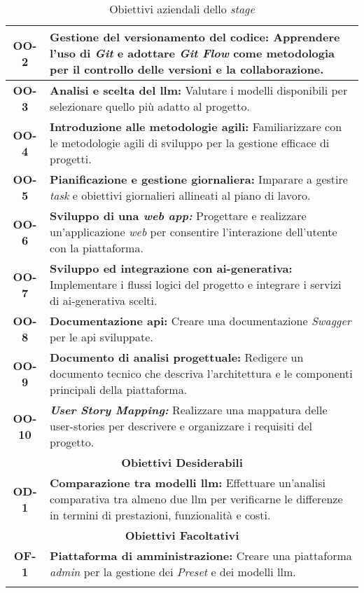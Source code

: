 \begin{longtable}{|c|>{\centering\arraybackslash}p{}|}
    \hline
    \textbf{OO-2} & \textbf{Gestione del versionamento del codice:} Apprendere l'uso di \textit{Git} e adottare \textit{Git Flow} come metodologia per il controllo delle versioni e la collaborazione. \\
    \hline
    \textbf{OO-3} & \textbf{Analisi e scelta del \gls{llm}:} Valutare i modelli disponibili per selezionare quello più adatto al progetto. \\
    \hline
    \textbf{OO-4} & \textbf{Introduzione alle metodologie agili:} Familiarizzare con le metodologie agili di sviluppo per la gestione efficace di progetti. \\
    \hline
    \textbf{OO-5} & \textbf{Pianificazione e gestione giornaliera:} Imparare a gestire \textit{task} e obiettivi giornalieri allineati al piano di lavoro. \\
    \hline
    \textbf{OO-6} & \textbf{Sviluppo di una \textit{web app:}} Progettare e realizzare un'applicazione \textit{web} per consentire l'interazione dell'utente con la piattaforma. \\
    \hline
    \textbf{OO-7} & \textbf{Sviluppo ed integrazione con \gls{ai-generativa}:} Implementare i flussi logici del progetto e integrare i servizi di \gls{ai-generativa} scelti. \\
    \hline
    \textbf{OO-8} & \textbf{Documentazione \gls{api}:} Creare una documentazione \textit{Swagger} per le \gls{api} sviluppate. \\
    \hline
    \textbf{OO-9} & \textbf{Documento di analisi progettuale:} Redigere un documento tecnico che descriva l'architettura e le componenti principali della piattaforma. \\
    \hline
    \textbf{OO-10} & \textbf{\textit{User Story Mapping:}} Realizzare una mappatura delle \gls{user-stories} per descrivere e organizzare i requisiti del progetto. \\
    \hline
    \multicolumn{2}{|c|}{\rowcolor{green!30} \textbf{Obiettivi Desiderabili}} \\
    \hline %
    \textbf{OD-1} & \textbf{Comparazione tra modelli \gls{llm}:} Effettuare un'analisi comparativa tra almeno due \gls{llm} per verificarne le differenze in termini di prestazioni, funzionalità e costi. \\
    \hline
    \multicolumn{2}{|c|}{\rowcolor{green!30} \textbf{Obiettivi Facoltativi}} \\
    \noalign{\hrule} %
    \textbf{OF-1} & \textbf{Piattaforma di amministrazione:} Creare una piattaforma \textit{admin} per la gestione dei \textit{Preset} e dei modelli \gls{llm}. \\
    \hline
    \caption{Obiettivi aziendali dello \textit{stage}} %
    \label{tab:obiettivi_stage} %
\end{longtable}
